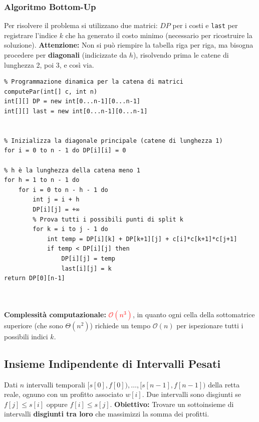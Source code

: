 \documentclass[12pt, a4paper]{article}
\begin{document}
\subsubsection{Algoritmo Bottom-Up}
Per risolvere il problema si utilizzano due matrici: $DP$ per i costi e \texttt{last} per registrare l'indice $k$ che ha generato il costo minimo (necessario per ricostruire la soluzione).
\textbf{Attenzione:} Non si può riempire la tabella riga per riga, ma bisogna procedere per \textbf{diagonali} (indicizzate da $h$), risolvendo prima le catene di lunghezza 2, poi 3, e così via.

\begin{verbatim}
% Programmazione dinamica per la catena di matrici
computePar(int[] c, int n)
int[][] DP = new int[0...n-1][0...n-1]
int[][] last = new int[0...n-1][0...n-1]


% Inizializza la diagonale principale (catene di lunghezza 1)
for i = 0 to n - 1 do DP[i][i] = 0

% h è la lunghezza della catena meno 1
for h = 1 to n - 1 do
    for i = 0 to n - h - 1 do
        int j = i + h
        DP[i][j] = +∞
        % Prova tutti i possibili punti di split k
        for k = i to j - 1 do
            int temp = DP[i][k] + DP[k+1][j] + c[i]*c[k+1]*c[j+1]
            if temp < DP[i][j] then
                DP[i][j] = temp
                last[i][j] = k
return DP[0][n-1]



\end{verbatim}
\textbf{Complessità computazionale:} \textcolor{red}{$\mathcal{O}(n^3)$}, in quanto ogni cella della sottomatrice superiore (che sono $\Theta(n^2)$) richiede un tempo $\mathcal{O}(n)$ per ispezionare tutti i possibili indici $k$.

\newpage

\subsection{Insieme Indipendente di Intervalli Pesati}

\begin{tcolorbox}[colback=lightergray!10, colframe=tocsec, title=\textbf{Definizione del Problema}]
Dati $n$ intervalli temporali $[s[0], f[0]), \dots, [s[n-1], f[n-1])$ della retta reale, ognuno con un profitto associato $w[i]$. Due intervalli sono disgiunti se $f[j] \le s[i]$ oppure $f[i] \le s[j]$.
\textbf{Obiettivo:} Trovare un sottoinsieme di intervalli \textbf{disgiunti tra loro} che massimizzi la somma dei profitti.
\end{tcolorbox}
\end{document}
